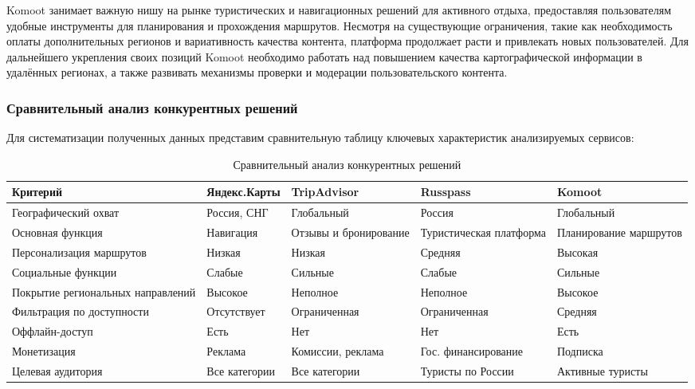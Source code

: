 Komoot занимает важную нишу на рынке туристических и навигационных решений для активного отдыха, предоставляя пользователям удобные инструменты для планирования и прохождения маршрутов. Несмотря на существующие ограничения, такие как необходимость оплаты дополнительных регионов и вариативность качества контента, платформа продолжает расти и привлекать новых пользователей. Для дальнейшего укрепления своих позиций Komoot необходимо работать над повышением качества картографической информации в удалённых регионах, а также развивать механизмы проверки и модерации пользовательского контента.

\subsubsection*{Сравнительный анализ конкурентных решений}

Для систематизации полученных данных представим сравнительную таблицу ключевых характеристик анализируемых сервисов:

\begin{table}[h]
\centering
\small
\begin{tabular}{| p{35mm} | p{25mm} | p{25mm} | p{25mm} | p{25mm} |}
\hline
\textbf{Критерий} & \textbf{Яндекс.Карты} & \textbf{TripAdvisor} & \textbf{Russpass} & \textbf{Komoot} \\
\hline
Географический охват & Россия, СНГ & Глобальный & Россия & Глобальный \\
\hline
Основная функция & Навигация & Отзывы и бронирование & Туристическая платформа & Планирование маршрутов \\
\hline
Персонализация маршрутов & Низкая & Низкая & Средняя & Высокая \\
\hline
Социальные функции & Слабые & Сильные & Слабые & Сильные \\
\hline
Покрытие региональных направлений & Высокое & Неполное & Неполное & Высокое \\
\hline
Фильтрация по доступности & Отсутствует & Ограниченная & Ограниченная & Средняя \\
\hline
Оффлайн-доступ & Есть & Нет & Нет & Есть \\
\hline
Монетизация & Реклама & Комиссии, реклама & Гос. финансирование & Подписка \\
\hline
Целевая аудитория & Все категории & Все категории & Туристы по России & Активные туристы \\
\hline
\end{tabular}
\caption{Сравнительный анализ конкурентных решений}
\end{table}

